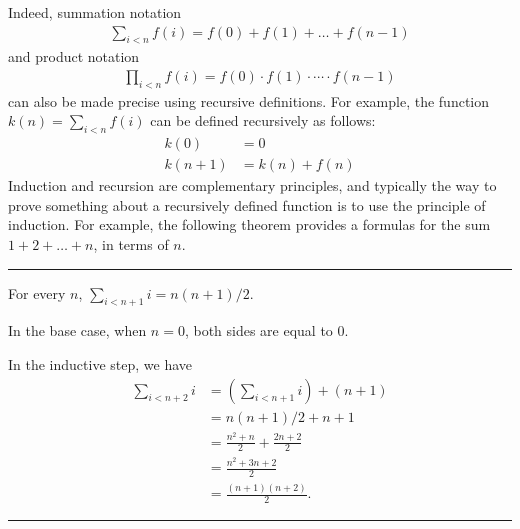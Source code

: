 \documentclass[letterpaper,10pt,english]{sphinxmanual}
\begin{document}
\sphinxAtStartPar
Indeed, summation notation
\begin{equation*}
\begin{split}\sum_{i < n} f (i) = f(0) + f(1) + \ldots + f(n-1)\end{split}
\end{equation*}
\sphinxAtStartPar
and product notation
\begin{equation*}
\begin{split}\prod_{i < n} f (i) = f(0) \cdot f(1) \cdot \cdots \cdot f(n-1)\end{split}
\end{equation*}
\sphinxAtStartPar
can also be made precise using recursive definitions. For example, the function \(k(n) = \sum_{i < n} f (i)\) can be defined recursively as follows:
\begin{equation*}
\begin{split}k(0) &= 0 \\
k(n+1) &= k(n) + f(n)\end{split}
\end{equation*}
\sphinxAtStartPar
Induction and recursion are complementary principles, and typically the way to prove something about a recursively defined function is to use the principle of induction. For example, the following theorem provides a formulas for the sum \(1 + 2 + \ldots + n\), in terms of \(n\).


\bigskip\hrule\bigskip


\sphinxAtStartPar
{} For every \(n\), \(\sum_{i < n + 1} i = n (n + 1) / 2\).

\sphinxAtStartPar
{} In the base case, when \(n = 0\), both sides are equal to \(0\).

\sphinxAtStartPar
In the inductive step, we have
\begin{equation*}
\begin{split}\sum_{i < n + 2} i & = \left(\sum_{i < n + 1} i\right) + (n + 1) \\
& = n (n + 1) / 2 + n + 1 \\
& = \frac{n^2 +n}{2} + \frac{2n + 2}{2} \\
& = \frac{n^2 + 3n + 2}{2} \\
& = \frac{(n+1)(n+2)}{2}.\end{split}
\end{equation*}

\bigskip\hrule\bigskip
\end{document}
